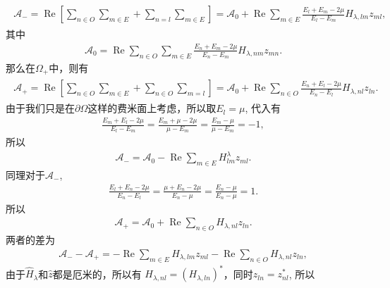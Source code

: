 \documentclass[10pt, oneside]{article}
\begin{document}
\begin{align}
	\begin{split}
		\mathcal{A}_{-}  = \operatorname{Re} \left[\sum_{n \in O} \sum_{m \in E} + \sum_{n =l} \sum_{m \in E}\right] = \mathcal{A}_{0} + \operatorname{Re} \sum_{m \in E} \frac{E_{l} + E_{m } - 2 \mu}{E_{l} - E_{m }} H_{\lambda,lm} z_{ml} ,
	\end{split}
\end{align}
其中
\begin{align}
	\mathcal{A}_{0} = \operatorname{Re} \sum_{n \in O} \sum_{m \in E} \frac{E_{n} + E_{m } - 2 \mu}{E_{n } - E_{m }} H_{\lambda, nm} z_{mn}.
\end{align}
那么在\(\Omega_{+}\)中，则有
\begin{align}
	\begin{split}
		\mathcal{A}_{+} =  \operatorname{Re} \left[\sum_{n \in O} \sum_{m \in E} + \sum_{n \in O} \sum_{m = l}\right] = \mathcal{A}_{0} + \operatorname{Re} \sum_{n \in O } \frac{E_{n} + E_{l} - 2 \mu}{E_{n } - E_{l}} H_{\lambda,nl} z_{ln}.
	\end{split}
\end{align}
由于我们只是在\(\partial \Omega\)这样的费米面上考虑，所以取\(E_{l} = \mu\), 代入有
\begin{align}
	\frac{E_{m } + E_{l } - 2 \mu }{E_{l } - E_{m }} = \frac{ E_{m } + \mu - 2 \mu}{\mu - E_{m }} = \frac{E_{m } - \mu}{\mu - E_{m }} = -1,
\end{align}
所以
\begin{align}
	\mathcal{A}_{-} = \mathcal{A}_{0} - \operatorname{Re}  \sum_{m \in E } H^{\lambda}_{lm } z_{m l}.
\end{align}
同理对于\(\mathcal{A}_{- }\),
\begin{align} 
	\frac{E_{l } + E_{n } - 2 \mu}{E_{n } - E_{l}} = \frac{\mu + E_{n } - 2 \mu}{E_{n } - \mu} = \frac{E_{n } - \mu}{E_{n } - \mu} = 1.
\end{align}
所以
\begin{align}
	\mathcal{A}_{+} = \mathcal{A}_{0} + \operatorname{Re} \sum_{n \in O } H_{\lambda,nl} z_{ln}.
\end{align}
两者的差为
\begin{align}
	\mathcal{A}_{-} - \mathcal{A}_{+} = - \operatorname{Re} \sum_{m \in E } H_{\lambda,lm} z_{m l} - \operatorname{Re} \sum_{n \in O } H_{\lambda,nl} z_{ln},
\end{align}
由于\(\hat{H}_{\lambda}\)和\( \hat{z} \)都是厄米的，所以有 \(H_{\lambda,nl} = \left(H_{\lambda,ln}\right)^{*}\)，同时\(z_{ln} = z^{*}_{nl}\), 所以
\end{document}
